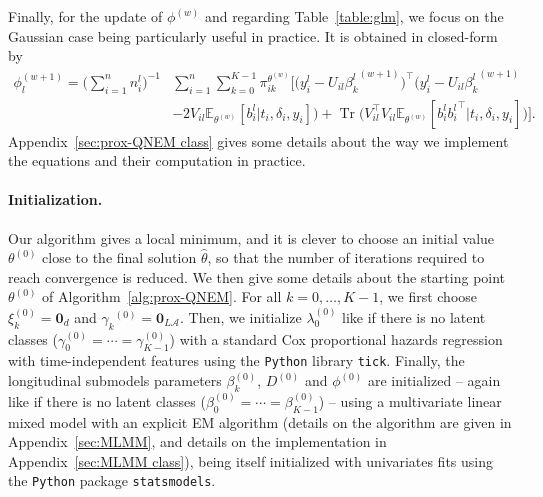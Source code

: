 \documentclass[11pt]{article}
\DeclareMathOperator{\Tr}{Tr}
\newcommand{\cA}{\mathcal A}
\newcommand{\E}{\mathds E}
\begin{document}
Finally, for the update of $\phi^{(w)}$ and regarding Table~\ref{table:glm}, we focus on the Gaussian case being particularly useful in practice. It is obtained in closed-form by
\begin{align}
  \label{eq:update_phi}
  \phi_l^{(w+1)} = \big(\sum_{i=1}^n n_i^l \big)^{-1} &\sum_{i=1}^n \sum_{k=0}^{K-1} \pi_{ik}^{\theta^{(w)}} \Big[ \big(y_i^l - U_{il} {\beta_k^l}^{(w+1)}\big)^\top \Big(y_i^l - U_{il} {\beta_k^l}^{(w+1)} \nonumber \\
  & - 2V_{il} \E_{\theta^{(w)}}[ b_i^l | t_i, \delta_i, y_i]\Big) + \Tr\big(V_{il}^\top V_{il} \E_{\theta^{(w)}}[ b_i^l {b_i^l}^\top | t_i, \delta_i, y_i]\big) \Big].
\end{align}
Appendix~\ref{sec:prox-QNEM class} gives some details about the way we implement the equations and their computation in practice.

\paragraph*{Initialization.}
Our algorithm gives a local minimum, and it is clever to choose an initial value $\theta^{(0)}$ close to the final solution $\hat \theta$, so that the number of iterations required to reach convergence is reduced. We then give some details about the starting point $\theta^{(0)}$ of Algorithm~\ref{alg:prox-QNEM}.
For all $k = 0, \ldots, K-1$, we first choose $\xi_k^{(0)} = \mathbf{0}_d$ and ${\gamma_k}^{(0)} = \mathbf{0}_{L\cA}$. Then, we initialize $\lambda_0^{(0)}$ like if there is no latent classes ($\gamma_{0}^{(0)} = \cdots = \gamma_{K-1}^{(0)}$) with a standard Cox proportional hazards regression with time-independent features using the \texttt{Python} library \texttt{tick}. Finally, the longitudinal submodels parameters $\beta_k^{(0)}$, $D^{(0)}$ and $\phi^{(0)}$ are initialized -- again like if there is no latent classes ($\beta_0^{(0)} = \cdots = \beta_{K-1}^{(0)}$) -- using a multivariate linear mixed model with an explicit EM algorithm (details on the algorithm are given in Appendix~\ref{sec:MLMM}, and details on the implementation in Appendix~\ref{sec:MLMM class}), being itself initialized with univariates fits using the \texttt{Python} package \texttt{statsmodels}.
\end{document}
